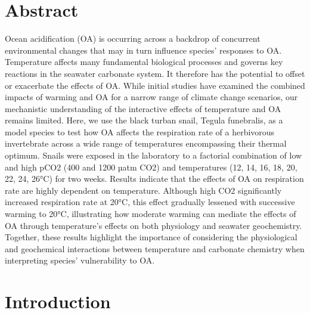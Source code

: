 \documentclass[
  12pt,
]{article}
\begin{document}
\newpage
\listoffigures
\newpage


\section*{Abstract}

Ocean acidification (OA) is occurring across a backdrop of concurrent
environmental changes that may in turn influence species' responses to
OA. Temperature affects many fundamental biological processes and
governs key reactions in the seawater carbonate system. It therefore has
the potential to offset or exacerbate the effects of OA. While initial
studies have examined the combined impacts of warming and OA for a
narrow range of climate change scenarios, our mechanistic understanding
of the interactive effects of temperature and OA remains limited. Here,
we use the black turban snail, Tegula funebralis, as a model species to
test how OA affects the respiration rate of a herbivorous invertebrate
across a wide range of temperatures encompassing their thermal optimum.
Snails were exposed in the laboratory to a factorial combination of low
and high pCO2 (400 and 1200 µatm CO2) and temperatures (12, 14, 16, 18,
20, 22, 24, 26°C) for two weeks. Results indicate that the effects of OA
on respiration rate are highly dependent on temperature. Although high
CO2 significantly increased respiration rate at 20°C, this effect
gradually lessened with successive warming to 20°C, illustrating how
moderate warming can mediate the effects of OA through temperature's
effects on both physiology and seawater geochemistry. Together, these
results highlight the importance of considering the physiological and
geochemical interactions between temperature and carbonate chemistry
when interpreting species' vulnerability to OA.

\newpage

\hypertarget{introduction}{%
\section{Introduction}\label{introduction}}
\end{document}
